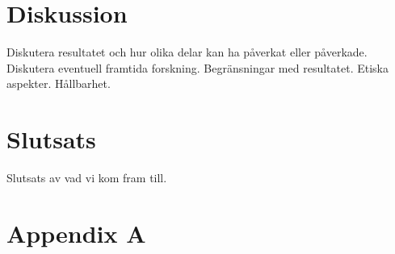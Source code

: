 \documentclass{kththesis}
\begin{document}
\chapter{Diskussion}
Diskutera resultatet och hur olika delar kan ha påverkat eller påverkade. Diskutera eventuell framtida forskning. Begränsningar med resultatet.
Etiska aspekter. Hållbarhet. 

\chapter{Slutsats}
Slutsats av vad vi kom fram till.

\printbibliography[heading=bibintoc]
\appendix
  \chapter{Appendix A}

\tailmatter
\end{document}
